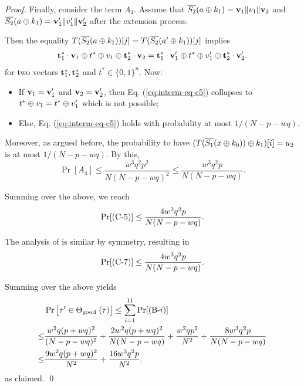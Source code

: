 \begin{proof}
Finally, consider the term $A_4$. Assume that $\overline{S_2}(a\oplus k_1)=\mathbf{v}_1\|v_1\|\mathbf{v}_2$ and
$\overline{S_2}(a\oplus k_1)=\mathbf{v}_1'\|v_1'\|\mathbf{v}_2'$ after the extension process.

Then the equality $T(\overline{S_2}(a\oplus k_1))[j]=T(\overline{S_2}(a'\oplus k_1))[j]$ implies
%
%
\begin{align}
\mathbf{t}_1^*\cdot\mathbf{v}_1\oplus t^*\oplus v_1\oplus\mathbf{t}_2^*\cdot\mathbf{v}_2=\mathbf{t}_1^*\cdot\mathbf{v}_1'\oplus t^*\oplus v_1'\oplus\mathbf{t}_2^*\cdot\mathbf{v}_2'.
\label{eq:interm-eq-c5}
\end{align}
%
%
for two vectors $\mathbf{t}_1^*,\mathbf{t}_2^*$ and $t^*\in\{0,1\}^n$. Now:
\begin{itemize}
	\item If $\mathbf{v}_1=\mathbf{v}_1'$ and $\mathbf{v}_2=\mathbf{v}_2'$, then Eq. (\ref{eq:interm-eq-c5}) collapses to $t^*\oplus v_1=t^*\oplus v_1'$ which is not possible;
	\item Else, Eq. (\ref{eq:interm-eq-c5}) holds with probability at most $1/(N-p-wq)$.
\end{itemize}
Moreover, as argued before, the probability to have $(T(\overline{S_1}(x\oplus k_0))\oplus k_1)[i]=u_2$ is at most $1/(N-p-wq)$. By this,
%
$$\Pr[A_4]\leq\frac{w^3q^2p^2}{N(N-p-wq)^2}\leq\frac{w^3q^2p}{N(N-p-wq)}.$$
%
%

Summing over the above, we reach
%
$$\Pr[\text{(C-5)}]\leq\frac{4w^3q^2p}{N(N-p-wq)}.$$
%

The analysis of \cseven is similar by symmetry, resulting in
%
%
$$\Pr[\text{(C-7)}]\leq\frac{4w^3q^2p}{N(N-p-wq)}.$$
%



\arrangespace


Summing over the above yields
%
\begin{align*}
&  \Pr\big[ \tau' \in \Theta_{\text {good }}(\tau)\big]  \leq \sum_{i=1}^{11}\Pr[\text{(B-}i)]       \\
\leq  & \frac{w^2 q (p+w q)^{2}}{(N-p-wq)^{2}}+
\frac{2w^2 q (p+w q)^{2}}{N  (N-p-wq)}+
\frac{w^2qp^2}{N^2}+
\frac{8w^3q^2p}{N(N-p-wq)}      \\
\leq  & \frac{9w^2 q (p+w q)^{2}}{N^2}+ \frac{16w^3q^2p}{N^2} .
\end{align*}
%
as claimed.        \qed
\end{proof}











